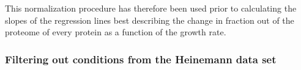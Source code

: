 This normalization procedure has therefore been used prior to calculating the slopes of the regression lines best describing the change in fraction out of the proteome of every protein as a function of the growth rate.
\subsubsection{Filtering out conditions from the Heinemann data set}
\label{heinemanncond} 